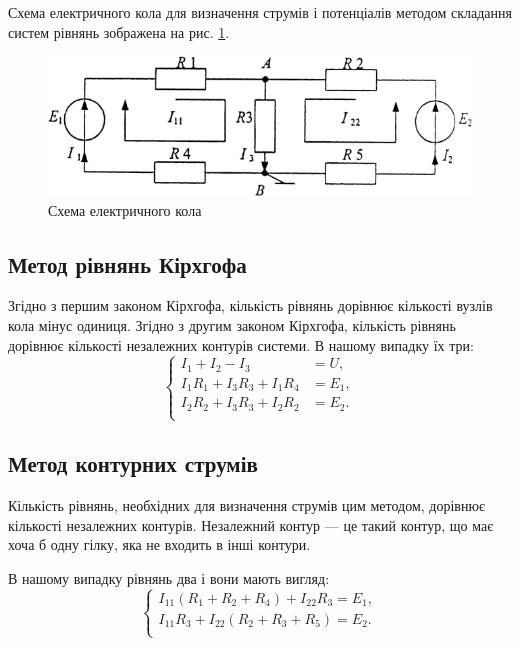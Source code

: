 \documentclass[a4paper,oneside,DIV=10,12pt]{scrartcl}
\begin{document}
		Схема електричного кола для визначення струмів і потенціалів методом складання систем рівнянь зображена на рис. \ref{fig:schematic}.
		
		\begin{figure}[!htbp]
			\centering
			\includegraphics[width=\textwidth]{schematic-01.png}
			\caption{Схема електричного кола}
			\label{fig:schematic}
		\end{figure}
		
		\subsection{Метод рівнянь Кірхгофа}
			Згідно з першим законом Кірхгофа, кількість рівнянь дорівнює кількості вузлів кола мінус одиниця. Згідно з другим законом Кірхгофа, кількість рівнянь дорівнює кількості незалежних контурів системи. В нашому випадку їх три:
			\[
				\begin{cases}
				I_1 + I_2 - I_3 &= U,\\
				I_1R_1 + I_3R_3 + I_1R_4 &= E_1,\\
				I_2R_2 + I_3R_3 + I_2R_2 &= E_2.\\
				\end{cases}
			\]
			
		\subsection{Метод контурних струмів}
			Кількість рівнянь, необхідних для визначення струмів цим методом, дорівнює кількості незалежних контурів. Незалежний контур --- це такий контур, що має хоча б одну гілку, яка не входить в інші контури.
			
			В нашому випадку рівнянь два і вони мають вигляд:
			\[
				\begin{cases}
					I_{11}(R_1 + R_2 + R_4) + I_{22} R_3 = E_1,\\
					I_{11} R_3 + I_{22}(R_2 + R_3 + R_5) = E_2.\\
				\end{cases}
			\]
			
\end{document}
